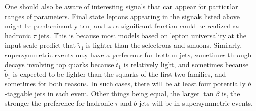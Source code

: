 \documentclass[12pt]{article}
\def\stilde{\widetilde}
\begin{document}
One should also be aware of interesting signals that can appear for particular ranges of 
parameters. Final state leptons appearing in the signals listed above might be 
predominantly tau, and so a significant fraction could be realized as hadronic $\tau$ jets. 
This is because most models based on lepton universality at the input scale 
predict that $\stilde \tau_1$ is lighter than the selectrons 
and smuons. Similarly, supersymmetric events may have a preference for bottom jets, 
sometimes through decays involving top quarks because $\stilde t_1$ is relatively light, 
and sometimes because $\stilde b_1$ is expected to be lighter than the squarks of the first 
two families, and sometimes for both reasons. In such cases, there will be at least four 
potentially $b$-taggable jets in each event. Other things being equal, the larger 
$\tan\beta$ is, the stronger the preference for hadronic $\tau$ and $b$ jets will be in 
supersymmetric events.
\end{document}
